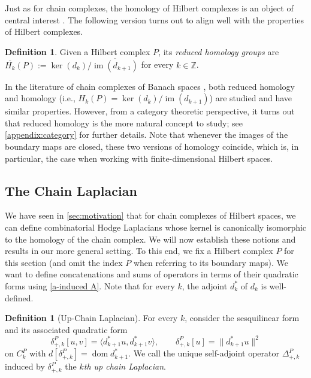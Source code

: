 \documentclass[11pt]{article}
\theoremstyle{definition}
\newtheorem{definition}[theorem]{Definition}
\theoremstyle{remark}
\DeclareMathOperator\dom{dom}
\DeclareMathOperator{\im}{im}
\newcommand{\IZ}{\mathbb{Z}}
\begin{document}
Just as for chain complexes, the homology of Hilbert complexes is an object of central interest \citep{Hilbert}. The following version turns out to align well with the properties of Hilbert complexes.

\begin{definition}\textnormal{\citep[Reduced Homology,][p. 466]{homologyclosure}} \label{def:redhom}
Given a Hilbert complex $P$, its \textit{reduced homology groups} are $\overline{H_k}(P) := \ker(d_k)/\overline{\im(d_{k+1})}$ for every $k \in \IZ$.
\end{definition}

In the literature of chain complexes of Banach spaces \citep{loeh}, both reduced homology and homology (i.e., $H_k(P)=\ker(d_k)/\im(d_{k+1})$) are studied and have similar properties. However, from a category theoretic perspective, it turns out that reduced homology is the more natural concept to study; see \cref{appendix:category} for further details. Note that whenever the images of the boundary maps are closed, these two versions of homology coincide, which is, in particular, the case when working with finite-dimensional Hilbert spaces.

\subsection{The Chain Laplacian} \label{sub:chainlap}


We have seen in \cref{sec:motivation} that for chain complexes of Hilbert spaces, we can define combinatorial Hodge Laplacians whose kernel is canonically isomorphic to the homology of the chain complex. We will now establish these notions and results in our more general setting.  To this end, we fix a Hilbert complex $P$ for this section (and omit the index $P$ when referring to its boundary maps).
We want to define concatenations and sums of operators in terms of their quadratic forms using \cref{a-induced A}. Note that for every $k$, the adjoint $d^*_k$ of $d_k$ is well-defined.

\begin{definition}[Up-Chain Laplacian]
\label{def:kth up chain laplacian}
For every $k$, consider the sesquilinear form and its associated quadratic form $$\delta^P_{+,k}[u,v]=\langle d_{k+1}^*u,d_{k+1}^*v\rangle,\qquad \delta_{+,k}^P[u]=\|d^*_{k+1}u\|^2$$ on $C_k^P$ with $d[\delta^P_{+,k}]=\dom d^*_{k+1}$. We call the unique self-adjoint operator $\Delta_{+,k}^P$ induced by $\delta^P_{+,k}$ the \textit{$k$th up chain Laplacian}. 
\end{definition}
\end{document}
